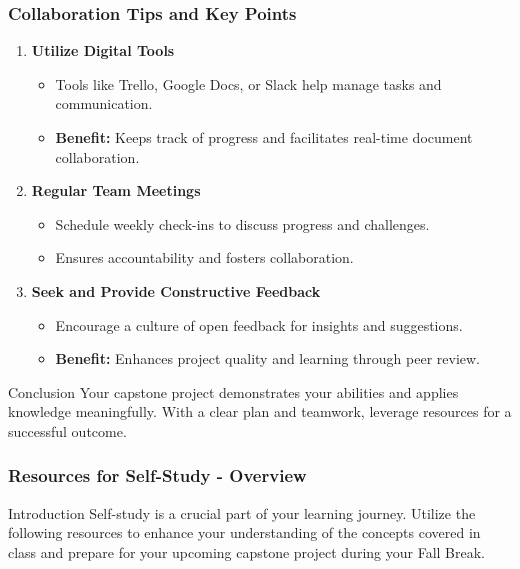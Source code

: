 \documentclass[aspectratio=169]{beamer}
\begin{document}
\begin{frame}[fragile]
\frametitle{Collaboration Tips and Key Points}

\begin{enumerate}
    \item \textbf{Utilize Digital Tools}
        \begin{itemize}
            \item Tools like Trello, Google Docs, or Slack help manage tasks and communication.
            \item \textbf{Benefit:} Keeps track of progress and facilitates real-time document collaboration.
        \end{itemize}

    \item \textbf{Regular Team Meetings}
        \begin{itemize}
            \item Schedule weekly check-ins to discuss progress and challenges.
            \item Ensures accountability and fosters collaboration.
        \end{itemize}

    \item \textbf{Seek and Provide Constructive Feedback}
        \begin{itemize}
            \item Encourage a culture of open feedback for insights and suggestions.
            \item \textbf{Benefit:} Enhances project quality and learning through peer review.
        \end{itemize}
\end{enumerate}

\begin{block}{Conclusion}
Your capstone project demonstrates your abilities and applies knowledge meaningfully. With a clear plan and teamwork, leverage resources for a successful outcome.
\end{block}

\end{frame}

\begin{frame}[fragile]
    \frametitle{Resources for Self-Study - Overview}
    \begin{block}{Introduction}
        Self-study is a crucial part of your learning journey. 
        Utilize the following resources to enhance your understanding of the concepts covered in class and prepare for your upcoming capstone project during your Fall Break.
    \end{block}
\end{frame}
\end{document}
